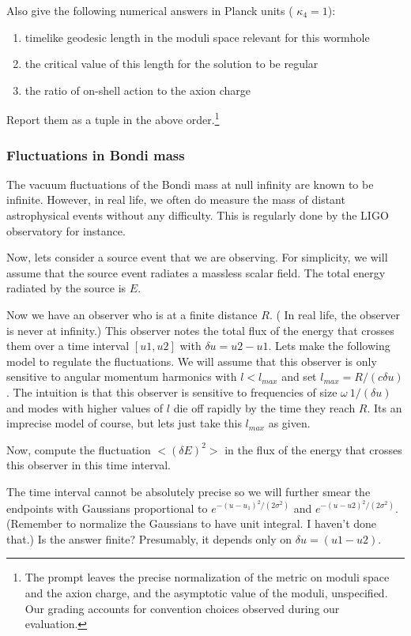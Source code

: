 Also give the following numerical answers in Planck units ( $\kappa_4 = 1$):
\begin{enumerate}
    \item timelike geodesic length in the moduli space relevant for this wormhole
    \item the critical value of this length for the solution to be regular
    \item  the ratio of on-shell action to the axion charge
\end{enumerate}

Report them as a tuple in the above order.\footnote{The prompt leaves the precise normalization of the metric on moduli space and the axion charge, and the asymptotic value of the moduli, unspecified. Our grading accounts for convention choices observed during our evaluation.}

\subsubsection{Fluctuations in Bondi mass}
\label{problem: bondi-mass-fluctuations}
The vacuum fluctuations of the Bondi mass at null infinity are known to be infinite. However, in real life, we often do measure the mass of distant astrophysical events without any difficulty. This is regularly done by the LIGO observatory for instance.

Now, lets consider a source event that we are observing. For simplicity, we will assume that the source event radiates a massless scalar field.  The total energy radiated by the source is $E$. 

Now we have an observer who is at a finite distance $R$. ( In real life, the observer is never at infinity.) This observer notes the total flux of the energy that crosses them over a time interval $[u1, u2]$ with $\delta u = u2 - u1$.  Lets make the following model to regulate the fluctuations. We will assume that this observer is only sensitive to angular momentum harmonics with $l < l_{max}$ and set $l_{max} = R/(c \delta u)$. The intuition is that this observer is sensitive to frequencies of size $\omega ~ 1/(\delta u)$ and modes with higher values of $l$ die off rapidly by the time they reach $R$. Its an imprecise model of course, but lets just take this $l_{max}$ as given. 

Now, compute the fluctuation $<(\delta E)^2>$ in the flux of the energy that crosses this observer in this time interval.

The time interval cannot be absolutely precise so we will further smear the endpoints with Gaussians proportional to $e^{-(u-u_1)^2/(2 \sigma^2)}$ and $e^{-(u-u2)^2/(2 \sigma^2)}$. (Remember to normalize the Gaussians to have unit integral. I haven't done that.) Is the answer finite? Presumably,  it depends only on $\delta u = (u1 - u2)$.

